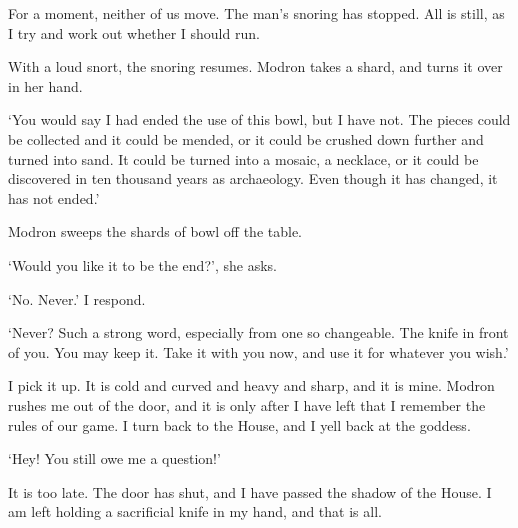 For a moment, neither of us move. The man’s snoring has stopped. All
is still, as I try and work out whether I should run.

With a loud snort, the snoring resumes. Modron takes a shard, and
turns it over in her hand.

`You would say I had ended the use of this bowl, but I have not. The
pieces could be collected and it could be mended, or it could be
crushed down further and turned into sand. It could be turned into a
mosaic, a necklace, or it could be discovered in ten thousand years as
archaeology. Even though it has changed, it has not ended.'

Modron sweeps the shards of bowl off the table.

`Would you like it to be the end?', she asks.

`No. Never.' I respond.

`Never? Such a strong word, especially from one so changeable. The
knife in front of you. You may keep it. Take it with you now, and use
it for whatever you wish.'

I pick it up. It is cold and curved and heavy and sharp, and it is
mine. Modron rushes me out of the door, and it is only after I have
left that I remember the rules of our game. I turn back to the House,
and I yell back at the goddess.

`Hey! You still owe me a question!'

It is too late. The door has shut, and I have passed the shadow of the
House. I am left holding a sacrificial knife in my hand, and that is
all.


